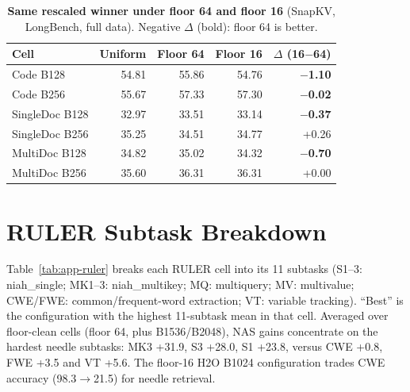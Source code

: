 \begin{table}[!htbp]
  \centering
  \scriptsize
  \setlength{\tabcolsep}{3pt}
  \begin{tabular}{@{}l r r r r@{}}
    \toprule
    Cell & Uniform & Floor 64 & Floor 16 & $\Delta$ (16$-$64) \\
    \midrule
    Code B128 & 54.81 & 55.86 & 54.76 & \textbf{$-$1.10} \\
    Code B256 & 55.67 & 57.33 & 57.30 & \textbf{$-$0.02} \\
    SingleDoc B128 & 32.97 & 33.51 & 33.14 & \textbf{$-$0.37} \\
    SingleDoc B256 & 35.25 & 34.51 & 34.77 & +0.26 \\
    MultiDoc B128 & 34.82 & 35.02 & 34.32 & \textbf{$-$0.70} \\
    MultiDoc B256 & 35.60 & 36.31 & 36.31 & +0.00 \\
    \bottomrule
  \end{tabular}
  \caption{\textbf{Same rescaled winner under floor 64 and floor 16} (SnapKV, LongBench, full data). Negative $\Delta$ (bold): floor 64 is better.}
  \label{tab:app-floor-ablation}
\end{table}


\section{RULER Subtask Breakdown}
\label{app:ruler}

Table~\ref{tab:app-ruler} breaks each RULER cell into its 11 subtasks (S1--3: niah\_single; MK1--3: niah\_multikey; MQ: multiquery; MV: multivalue; CWE/FWE: common/frequent-word extraction; VT: variable tracking). ``Best'' is the configuration with the highest 11-subtask mean in that cell. Averaged over floor-clean cells (floor 64, plus B1536/B2048), NAS gains concentrate on the hardest needle subtasks: MK3 +31.9, S3 +28.0, S1 +23.8, versus CWE +0.8, FWE +3.5 and VT +5.6. The floor-16 H2O B1024 configuration trades CWE accuracy (98.3$\rightarrow$21.5) for needle retrieval.

